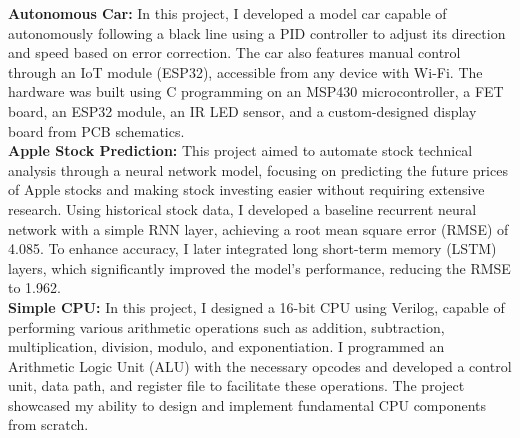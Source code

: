 \documentclass[letterpaper,9pt]{article}
\begin{document}
\noindent \textbf{Autonomous Car:} In this project, I developed a model car capable of autonomously following a black line using a PID controller to adjust its direction and speed based on error correction. The car also features manual control through an IoT module (ESP32), accessible from any device with Wi-Fi. The hardware was built using C programming on an MSP430 microcontroller, a FET board, an ESP32 module, an IR LED sensor, and a custom-designed display board from PCB schematics.\\

\noindent \textbf{Apple Stock Prediction:} This project aimed to automate stock technical analysis through a neural network model, focusing on predicting the future prices of Apple stocks and making stock investing easier without requiring extensive research. Using historical stock data, I developed a baseline recurrent neural network with a simple RNN layer, achieving a root mean square error (RMSE) of 4.085. To enhance accuracy, I later integrated long short-term memory (LSTM) layers, which significantly improved the model’s performance, reducing the RMSE to 1.962.\\

\noindent \textbf{Simple CPU:} In this project, I designed a 16-bit CPU using Verilog, capable of performing various arithmetic operations such as addition, subtraction, multiplication, division, modulo, and exponentiation. I programmed an Arithmetic Logic Unit (ALU) with the necessary opcodes and developed a control unit, data path, and register file to facilitate these operations. The project showcased my ability to design and implement fundamental CPU components from scratch.
\end{document}
